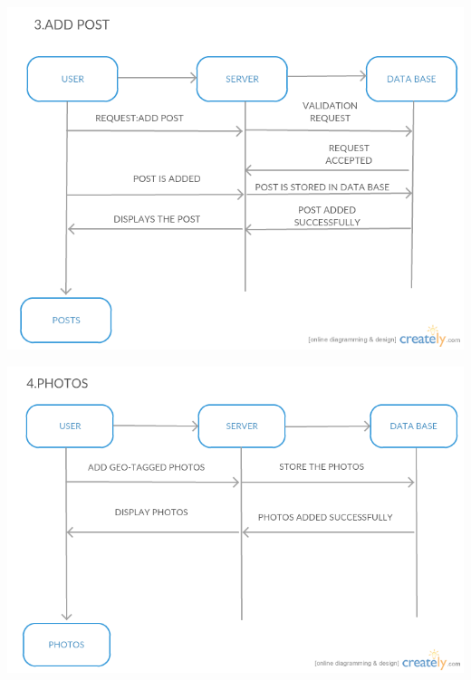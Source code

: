 \documentclass{article}
\begin{document}
\begin{center}
\includegraphics[scale=0.6]{post.png}
\newpage
\graphicspath{ {/home/smily/Desktop/photos.png/} }

\includegraphics[scale=0.6]{photos.png}
\newpage
\graphicspath{ {/home/smily/Desktop/search_dairy.png} }


\end{center}
\end{document}
